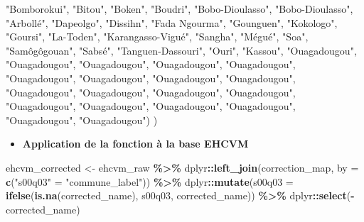 \documentclass[
]{article}
\newenvironment{Shaded}{\begin{snugshade}}{\end{snugshade}}
\newcommand{\AttributeTok}[1]{\textcolor[rgb]{0.13,0.29,0.53}{#1}}
\newcommand{\FunctionTok}[1]{\textcolor[rgb]{0.13,0.29,0.53}{\textbf{#1}}}
\newcommand{\NormalTok}[1]{#1}
\newcommand{\OtherTok}[1]{\textcolor[rgb]{0.56,0.35,0.01}{#1}}
\newcommand{\SpecialCharTok}[1]{\textcolor[rgb]{0.81,0.36,0.00}{\textbf{#1}}}
\newcommand{\StringTok}[1]{\textcolor[rgb]{0.31,0.60,0.02}{#1}}
\providecommand{\tightlist}{%
  \setlength{\itemsep}{0pt}\setlength{\parskip}{0pt}}
\begin{document}
\begin{Shaded}
\begin{Highlighting}[]
    \StringTok{"Bomborokui"}\NormalTok{, }\StringTok{"Bitou"}\NormalTok{, }\StringTok{"Boken"}\NormalTok{, }\StringTok{"Boudri"}\NormalTok{,}
    \StringTok{"Bobo{-}Dioulasso"}\NormalTok{, }\StringTok{"Bobo{-}Dioulasso"}\NormalTok{, }\StringTok{"Arbollé"}\NormalTok{,}
    \StringTok{"Dapeolgo"}\NormalTok{, }\StringTok{"Dissihn"}\NormalTok{, }\StringTok{"Fada Ngourma"}\NormalTok{, }\StringTok{"Gounguen"}\NormalTok{,}
    \StringTok{"Kokologo"}\NormalTok{, }\StringTok{"Goursi"}\NormalTok{, }\StringTok{"La{-}Toden"}\NormalTok{, }\StringTok{"Karangasso{-}Vigué"}\NormalTok{,}
    \StringTok{"Sangha"}\NormalTok{, }\StringTok{"Mégué"}\NormalTok{, }\StringTok{"Soa"}\NormalTok{, }\StringTok{"Samôgôgouan"}\NormalTok{, }\StringTok{"Sabsé"}\NormalTok{,}
    \StringTok{"Tanguen{-}Dassouri"}\NormalTok{, }\StringTok{"Ouri"}\NormalTok{, }\StringTok{"Kassou"}\NormalTok{, }\StringTok{"Ouagadougou"}\NormalTok{, }
    \StringTok{"Ouagadougou"}\NormalTok{, }\StringTok{"Ouagadougou"}\NormalTok{, }\StringTok{"Ouagadougou"}\NormalTok{,}
    \StringTok{"Ouagadougou"}\NormalTok{, }\StringTok{"Ouagadougou"}\NormalTok{, }\StringTok{"Ouagadougou"}\NormalTok{,}
    \StringTok{"Ouagadougou"}\NormalTok{, }\StringTok{"Ouagadougou"}\NormalTok{, }\StringTok{"Ouagadougou"}\NormalTok{,}
    \StringTok{"Ouagadougou"}\NormalTok{, }\StringTok{"Ouagadougou"}\NormalTok{, }\StringTok{"Ouagadougou"}\NormalTok{,}
    \StringTok{"Ouagadougou"}\NormalTok{, }\StringTok{"Ouagadougou"}\NormalTok{, }\StringTok{"Ouagadougou"}\NormalTok{,}
    \StringTok{"Ouagadougou"}\NormalTok{, }\StringTok{"Ouagadougou"}\NormalTok{, }\StringTok{"Ouagadougou"}\NormalTok{)}
\NormalTok{)}
\end{Highlighting}
\end{Shaded}

\begin{itemize}
\tightlist
\item
  \textbf{Application de la fonction à la base EHCVM}
\end{itemize}

\begin{Shaded}
\begin{Highlighting}[]
\NormalTok{ehcvm\_corrected }\OtherTok{\textless{}{-}}\NormalTok{ ehcvm\_raw }\SpecialCharTok{\%\textgreater{}\%}
\NormalTok{  dplyr}\SpecialCharTok{::}\FunctionTok{left\_join}\NormalTok{(correction\_map, }
                   \AttributeTok{by =} \FunctionTok{c}\NormalTok{(}\StringTok{"s00q03"} \OtherTok{=} \StringTok{"commune\_label"}\NormalTok{)) }\SpecialCharTok{\%\textgreater{}\%}
\NormalTok{  dplyr}\SpecialCharTok{::}\FunctionTok{mutate}\NormalTok{(}\AttributeTok{s00q03 =} \FunctionTok{ifelse}\NormalTok{(}\FunctionTok{is.na}\NormalTok{(corrected\_name),}
\NormalTok{                                s00q03, corrected\_name)) }\SpecialCharTok{\%\textgreater{}\%}
\NormalTok{  dplyr}\SpecialCharTok{::}\FunctionTok{select}\NormalTok{(}\SpecialCharTok{{-}}\NormalTok{corrected\_name)}
\end{Highlighting}
\end{Shaded}
\end{document}
